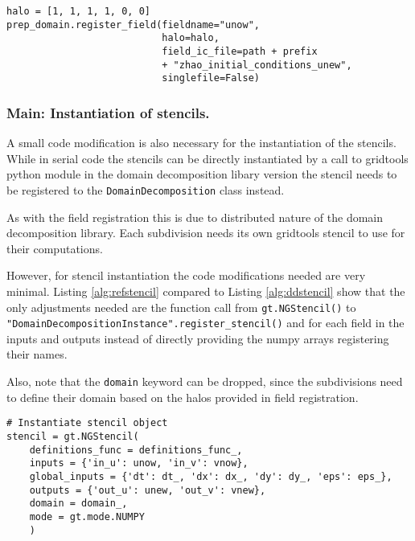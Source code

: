 \begin{lstlisting}[caption={Example code for field instantiation using the domain decomposition library in the case where the initial condtions where written to a file per subdivision.},captionpos=b, label={alg:ddinstant}, float, floatplacement=H]
halo = [1, 1, 1, 1, 0, 0]
prep_domain.register_field(fieldname="unow",
                           halo=halo,
                           field_ic_file=path + prefix 
                           + "zhao_initial_conditions_unew",
                           singlefile=False)
\end{lstlisting}

\subsubsection{Main: Instantiation of stencils.}
A small code modification is also necessary for the instantiation of the stencils.
While in serial code the stencils can be directly instantiated by a call to gridtools python module in the domain decomposition libary version the stencil needs to be registered to the \texttt{DomainDecomposition} class instead.

As with the field registration this is due to distributed nature of the domain decomposition library.
Each subdivision needs its own gridtools stencil to use for their computations.

However, for stencil instantiation the code modifications needed are very minimal.
Listing \ref{alg:refstencil} compared to Listing \ref{alg:ddstencil} show that the only adjustments needed are the function call from \texttt{gt.NGStencil()} to \texttt{"DomainDecompositionInstance".register\_stencil()} and for each field in the inputs and outputs instead of directly providing the numpy arrays registering their names.

Also, note that the \texttt{domain} keyword can be dropped, since the subdivisions need to define their domain based on the halos provided in field registration.

\begin{lstlisting}[caption={Example code for the original user stencil instantiation.},captionpos=b, label={alg:refstencil}, float, floatplacement=H]
# Instantiate stencil object
stencil = gt.NGStencil(
    definitions_func = definitions_func_,
    inputs = {'in_u': unow, 'in_v': vnow},
    global_inputs = {'dt': dt_, 'dx': dx_, 'dy': dy_, 'eps': eps_},
    outputs = {'out_u': unew, 'out_v': vnew},
    domain = domain_,
    mode = gt.mode.NUMPY
    )
\end{lstlisting}

